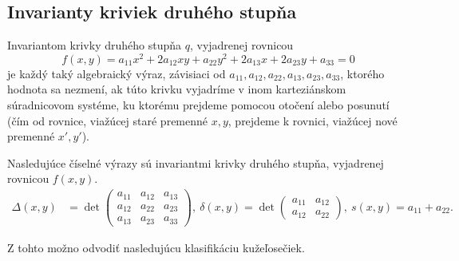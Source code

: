 \subsection{Invarianty kriviek druhého stupňa}
\begin{definition}
Invariantom krivky druhého stupňa $q$, vyjadrenej rovnicou
$$
f(x, y) = a_{11}x^2 + 2a_{12}xy + a_{22}y^2 + 2a_{13}x + 2a_{23}y + a_{33} = 0
$$
je každý taký algebraický výraz, závisiaci od \(a_{11}, a_{12}, a_{22}, a_{13}, a_{23}, a_{33}\), ktorého hodnota sa nezmení, ak túto krivku vyjadríme v inom karteziánskom súradnicovom systéme, ku ktorému prejdeme pomocou otočení alebo posunutí (čím od rovnice, viažúcej staré premenné \(x, y\), prejdeme k rovnici, viažúcej nové premenné \(x', y'\)).
\end{definition}

\begin{theorem}
Nasledujúce číselné výrazy sú invariantmi krivky druhého stupňa, vyjadrenej rovnicou $f(x, y)$.
\begin{align*}
\Delta(x,y) &= \det \begin{pmatrix} 
a_{11} & a_{12} & a_{13} \\ 
a_{12} & a_{22} & a_{23} \\
a_{13} & a_{23} & a_{33} \end{pmatrix}, \
\delta(x,y) = \det \begin{pmatrix} a_{11} & a_{12} \\ a_{12} & a_{22} \end{pmatrix}, \
s(x,y) = a_{11} + a_{22}.
\end{align*}
\end{theorem}
Z tohto možno odvodiť nasledujúcu klasifikáciu kužeľosečiek.


